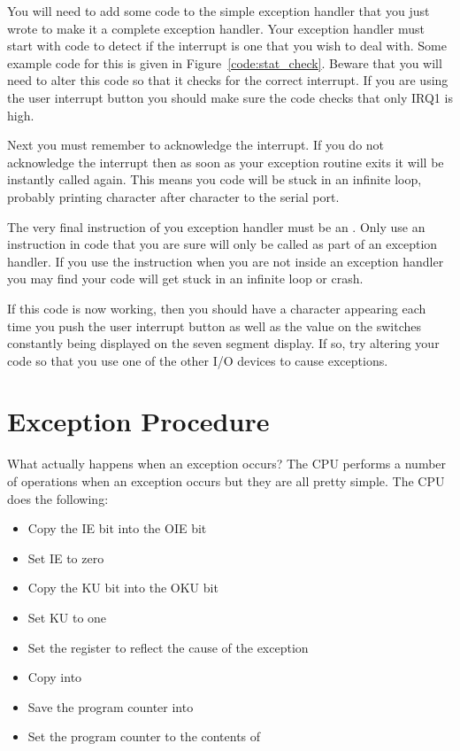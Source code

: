 You will need to add some code to the simple exception handler that
you just wrote to make it a complete exception handler. Your exception
handler must start with code to detect if the interrupt is one that
you wish to deal with. Some example code for this is given in
Figure~\ref{code:stat_check}. Beware that you will need to alter this
code so that it checks for the correct interrupt. If you are using the
user interrupt button you should make sure the code checks that only
IRQ1 is high.

Next you must remember to acknowledge the interrupt. If you do not
acknowledge the interrupt then as soon as your exception routine exits
it will be instantly called again. This means you code will be stuck
in an infinite loop, probably printing character after character to
the serial port.

The very final instruction of you exception handler must be an
. Only use an  instruction in code that you
are sure will only be called as part of an exception handler. If you
use the  instruction when you are not inside an exception
handler you may find your code will get stuck in an infinite loop or
crash.

If this code is now working, then you should have a character appearing
each time you push the user interrupt button as well as the value on the
switches constantly being displayed on the seven segment display. If so,
try altering your code so that you use one of the other I/O devices to
cause exceptions.

\section{Exception Procedure}

What actually happens when an exception occurs? The CPU performs a
number of operations when an exception occurs but they are all pretty
simple. The CPU does the following:

\begin{itemize}
\item Copy the IE bit into the OIE bit
\item Set IE to zero
\item Copy the KU bit into the OKU bit
\item Set KU to one
\item Set the  register to reflect the cause of the exception
\item Copy  into 
\item Save the program counter into 
\item Set the program counter to the contents of 
\end{itemize}

